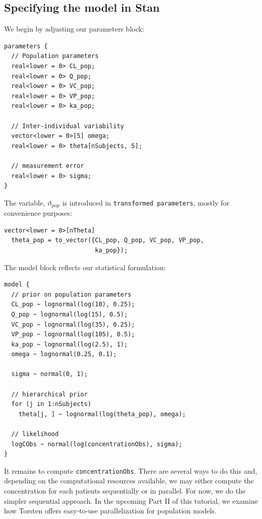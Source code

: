 \subsection{Specifying the model in Stan}

We begin by adjusting our parameters block:
\begin{lstlisting}[style=stan, numbers=none]
parameters {
  // Population parameters
  real<lower = 0> CL_pop;
  real<lower = 0> Q_pop;
  real<lower = 0> VC_pop;
  real<lower = 0> VP_pop;
  real<lower = 0> ka_pop;

  // Inter-individual variability
  vector<lower = 0>[5] omega;
  real<lower = 0> theta[nSubjects, 5];

  // measurement error
  real<lower = 0> sigma;
}
\end{lstlisting}
%
The variable, $\vartheta_\mathrm{pop}$ is introduced in \texttt{transformed parameters},
mostly for convenience purposes:
\begin{lstlisting}[style=stan, numbers=none]
vector<lower = 0>[nTheta]  
  theta_pop = to_vector({CL_pop, Q_pop, VC_pop, VP_pop, 
                         ka_pop});
\end{lstlisting}
%
The model block reflects our statistical formulation:
\begin{lstlisting}[style=stan, numbers=none] 
model {
  // prior on population parameters
  CL_pop ~ lognormal(log(10), 0.25); 
  Q_pop ~ lognormal(log(15), 0.5);
  VC_pop ~ lognormal(log(35), 0.25);
  VP_pop ~ lognormal(log(105), 0.5);
  ka_pop ~ lognormal(log(2.5), 1);
  omega ~ lognormal(0.25, 0.1);
  
  sigma ~ normal(0, 1);

  // hierarchical prior
  for (j in 1:nSubjects)
    theta[j, ] ~ lognormal(log(theta_pop), omega);

  // likelihood
  logCObs ~ normal(log(concentrationObs), sigma);
}
\end{lstlisting}
%
It remains to compute \texttt{concentrationObs}.
There are several ways to do this and, depending on the computational resources available, we may either compute the concentration for each patients sequentially or in parallel.
For now, we do the simpler sequential approach.
In the upcoming Part II of this tutorial, we examine how Torsten offers easy-to-use parallelization  for population models.

